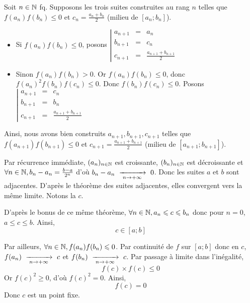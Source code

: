 \documentclass{article}
\begin{document}
\begin{question_kholle}
		Soit $n \in \mathbb N$ fq. Supposons les trois suites construites au rang $n$ telles que $f(a_n)f(b_n) \leqslant 0$ et $c_n = \frac{a_n+b_n}{2}$ (milieu de $[a_n;b_n]$).
		\begin{itemize}
			\item Si $f(a_n)f(b_n) \leqslant 0$, posons $\left| \begin{array}{lcl}
				a_{n+1} &=& a_n \\
				b_{n+1} &=& c_n \\
				c_{n+1} &=& \frac{a_{n+1}+b_{n+1}}{2}
			\end{array} \right.$
			\item Sinon $f(a_n)f(b_n) > 0$. Or $f(a_n)f(b_n) \leqslant 0$, donc $f(a_n)^2 f(b_n) f(c_n) \leqslant 0$. Donc $f(b_n)f(c_n) \leqslant 0$. Posons $\left| \begin{array}{lcl}
				a_{n+1} &=& c_n \\
				b_{n+1} &=& b_n \\
				c_{n+1} &=& \frac{a_{n+1}+b_{n+1}}{2}
			\end{array} \right.$
		\end{itemize}
		Ainsi, nous avons bien construits $a_{n+1}, b_{n+1}, c_{n+1}$ telles que $f(a_{n+1})f(b_{n+1}) \leqslant 0$ et ${ c_{n+1} = \frac{a_{n+1}+b_{n+1}}{2} }$ (milieu de $[a_{n+1};b_{n+1}]$).
		
		Par récurrence immédiate, $(a_n)_{n\in\mathbb N}$ est croissante, $(b_n)_{n\in\mathbb N}$ est décroissante et ${ \forall n \in \mathbb N, b_n - a_n = \frac{b-a}{2^n} }$ d'où $b_n - a_n \ \xrightarrow[\;n\to +\infty\;]{}\  0$.
		Donc les suites $a$ et $b$ sont adjacentes.
		D'après le théorème des suites adjacentes, elles convergent vers la même limite. Notons la $c$.

		D'après le bonus de ce même théorème, $\forall n \in \mathbb N, a_n \leqslant c \leqslant b_n$ donc pour $n = 0$, $a \leqslant c \leqslant b$. Ainsi,
		\begin{equation*}
			c \in [a;b]
		\end{equation*}
		
		Par ailleurs, $\forall n \in \mathbb N, f(a_n)f(b_n) \leqslant 0$. Par continuité de $f$ sur $[a;b]$ donc en $c$, $f(a_n) \ \xrightarrow[\;n\to +\infty\;]{}\  c$ et $f(b_n) \ \xrightarrow[\;n\to +\infty\;]{}\  c$. Par passage à limite dans l'inégalité,
		\begin{equation*}
			f(c) \times f(c) \leqslant 0
		\end{equation*}
		Or $f(c)^2 \geqslant 0$, d'où $f(c)^2 = 0$. Ainsi,
		\begin{equation*}
			f(c) = 0
		\end{equation*}
		Donc $c$ est un point fixe.
		
	\end{question_kholle}
	
\end{document}
